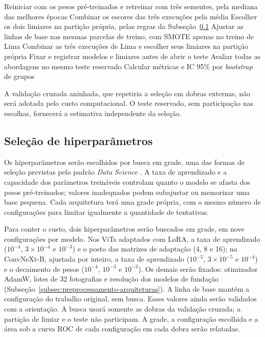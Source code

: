 \begin{algorithm}[H]
\begin{algorithmic}[1]
		\State Reiniciar com os pesos pré-treinados e retreinar com três sementes, pela mediana das melhores épocas
		\State Combinar os escores das três execuções pela média
		\State Escolher os dois limiares na partição própria, pelas regras da Subseção~\ref{subsec:hiperparametros}
		\EndFor
		\State Ajustar as linhas de base nas mesmas parcelas de treino, com SMOTE apenas no treino de Lima
		\State Combinar as três execuções de Lima e escolher seus limiares na partição própria
		\State Fixar e registrar modelos e limiares antes de abrir o teste
		\State Avaliar todas as abordagens no mesmo teste reservado
		\State Calcular métricas e IC 95\% por \textit{bootstrap} de grupos
	\end{algorithmic}
\end{algorithm}

A validação cruzada aninhada, que repetiria a seleção em dobras externas,
não será adotada pelo custo computacional. O teste reservado, sem
participação nas escolhas, fornecerá a estimativa independente da seleção.

\subsection{Seleção de hiperparâmetros}
\label{subsec:hiperparametros}

Os hiperparâmetros serão escolhidos por busca em grade, uma das formas de
seleção previstas pelo padrão \textit{Data Science}
\cite{acmSigsoftDataScience}. A taxa de aprendizado e a capacidade dos
parâmetros treináveis controlam quanto o modelo se afasta dos pesos
pré-treinados; valores inadequados podem subajustar ou memorizar uma base
pequena. Cada arquitetura terá uma grade própria, com o mesmo número de
configurações para limitar igualmente a quantidade de tentativas.

Para conter o custo, dois hiperparâmetros serão buscados em grade, em nove
configurações por modelo. Nos ViTs adaptados com LoRA, a taxa de
aprendizado ($10^{-4}$, $3 \times 10^{-4}$ e $10^{-3}$) e o posto das
matrizes de adaptação (4, 8 e 16); na ConvNeXt-B, ajustada por inteiro, a
taxa de aprendizado ($10^{-5}$, $3 \times 10^{-5}$ e $10^{-4}$) e o
decaimento de pesos ($10^{-4}$, $10^{-3}$ e $10^{-2}$). Os demais serão
fixados: otimizador AdamW, lotes de 32 fotografias e resolução dos
modelos de fundação (Subseção~\ref{subsec:preprocessamento-arquiteturas}). A linha de base mantém a configuração do trabalho
original, sem busca. Esses valores ainda serão validados com a orientação.
A busca usará somente as dobras da validação cruzada; a partição de limiar
e o teste não participam. A grade, a configuração escolhida e a área sob a
curva ROC de cada configuração em cada dobra serão relatadas.

